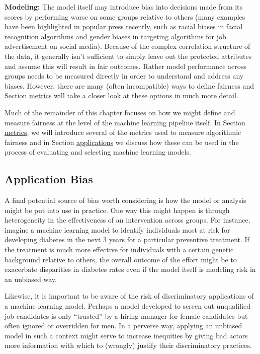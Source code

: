 \documentclass[]{krantz}
\begin{document}
\textbf{Modeling:} The model itself may introduce bias into decisions
made from its scores by performing worse on some groups relative to
others (many examples have been highlighted in popular press recently,
such as racial biases in facial recognition algorithms and gender biases
in targeting algorithms for job advertisement on social media). Because
of the complex correlation structure of the data, it generally isn't
sufficient to simply leave out the protected attributes and assume this
will result in fair outcomes. Rather model performance across groups
needs to be measured directly in order to understand and address any
biases. However, there are many (often incompatible) ways to define
fairness and Section \protect\hyperlink{sec:metrics}{metrics} will take
a closer look at these options in much more detail.

Much of the remainder of this chapter focuses on how we might define and
measure fairness at the level of the machine learning pipeline itself.
In Section \protect\hyperlink{sec:metrics}{metrics}, we will introduce
several of the metrics used to measure algorithmic fairness and in
Section \protect\hyperlink{sec:applications}{applications} we discuss
how these can be used in the process of evaluating and selecting machine
learning models.

\subsection{Application Bias}\label{application-bias}

A final potential source of bias worth considering is how the model or
analysis might be put into use in practice. One way this might happen is
through heterogeneity in the effectiveness of an intervention across
groups. For instance, imagine a machine learning model to identify
individuals most at risk for developing diabetes in the next 3 years for
a particular preventive treatment. If the treatment is much more
effective for individuals with a certain genetic background relative to
others, the overall outcome of the effort might be to exacerbate
disparities in diabetes rates even if the model itself is modeling risk
in an unbiased way.

Likewise, it is important to be aware of the risk of discriminatory
applications of a machine learning model. Perhaps a model developed to
screen out unqualified job candidates is only ``trusted'' by a hiring
manager for female candidates but often ignored or overridden for men.
In a perverse way, applying an unbiased model in such a context might
serve to increase inequities by giving bad actors more information with
which to (wrongly) justify their discriminatory practices.
\end{document}
